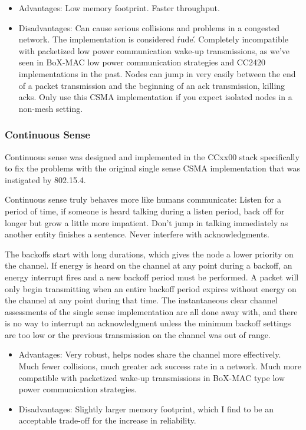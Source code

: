 \documentclass{article}
\begin{document}
\begin{itemize}
  \item Advantages: Low memory footprint. Faster throughput.
  \item Disadvantages: Can cause serious collisions and problems in a 
  congested network. The implementation is considered \'rude\'. 
  Completely incompatible with packetized low power communication wake-up 
  transmissions, as we've seen in BoX-MAC low power communication 
  strategies and CC2420 implementations in the past. Nodes can 
  jump in very easily between the end of a packet transmission
  and the beginning of an ack transmission, killing acks. Only use this
  CSMA implementation if you expect isolated nodes in a non-mesh
  setting.
\end{itemize}

\subsubsection{Continuous Sense}
\label{sec:continuoussense}
Continuous sense was designed and implemented in the CCxx00 stack
specifically to fix the problems with the original single sense CSMA implementation that was instigated by 802.15.4.

Continuous sense truly behaves more like humans communicate: Listen
for a period of time, if someone is heard talking during a listen period,
back off for longer but grow a little more impatient. Don't jump
in talking immediately as another entity finishes a sentence. Never interfere with acknowledgments.

The backoffs start with long durations, which gives the node a lower
priority on the channel. If energy is heard on the channel at any point
during a backoff, an energy interrupt fires and a new backoff period 
must be performed. A packet will only begin transmitting when an 
entire backoff period expires without energy on the channel at any point
during that time. The instantaneous clear channel assessments of the
single sense implementation are all done away with, and there is no way
to interrupt an acknowledgment unless the minimum backoff settings are too low or the previous transmission on the channel was out of range.

\begin{itemize}
  \item Advantages: Very robust, helps nodes share the channel
  more effectively. Much fewer collisions, much greater ack success
  rate in a network. Much more compatible with packetized wake-up
  transmissions in BoX-MAC type low power communication strategies.
  \item Disadvantages: Slightly larger memory footprint, which I find
  to be an acceptable trade-off for the increase in reliability.
\end{itemize}
\end{document}
